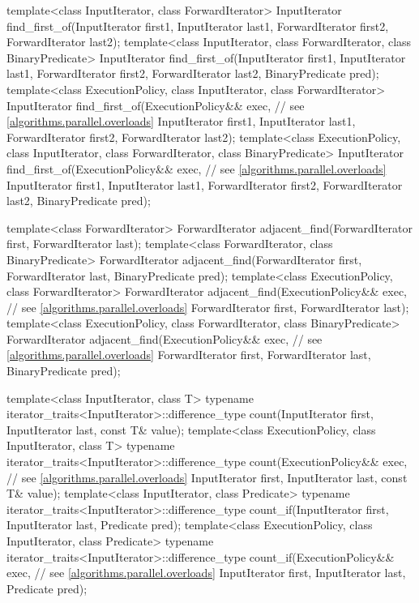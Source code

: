 \begin{codeblock}
{  template<class InputIterator, class ForwardIterator>
    InputIterator
      find_first_of(InputIterator first1, InputIterator last1,
                    ForwardIterator first2, ForwardIterator last2);
  template<class InputIterator, class ForwardIterator, class BinaryPredicate>
    InputIterator
      find_first_of(InputIterator first1, InputIterator last1,
                    ForwardIterator first2, ForwardIterator last2,
                    BinaryPredicate pred);
  template<class ExecutionPolicy, class InputIterator, class ForwardIterator>
    InputIterator
      find_first_of(ExecutionPolicy&& exec, // see \ref{algorithms.parallel.overloads}
                    InputIterator first1, InputIterator last1,
                    ForwardIterator first2, ForwardIterator last2);
  template<class ExecutionPolicy, class InputIterator,
           class ForwardIterator, class BinaryPredicate>
    InputIterator
      find_first_of(ExecutionPolicy&& exec, // see \ref{algorithms.parallel.overloads}
                    InputIterator first1, InputIterator last1,
                    ForwardIterator first2, ForwardIterator last2,
                    BinaryPredicate pred);

  template<class ForwardIterator>
    ForwardIterator adjacent_find(ForwardIterator first,
                                  ForwardIterator last);
  template<class ForwardIterator, class BinaryPredicate>
    ForwardIterator adjacent_find(ForwardIterator first,
                                  ForwardIterator last,
                                  BinaryPredicate pred);
  template<class ExecutionPolicy, class ForwardIterator>
    ForwardIterator adjacent_find(ExecutionPolicy&& exec, // see \ref{algorithms.parallel.overloads}
                                  ForwardIterator first,
                                  ForwardIterator last);
  template<class ExecutionPolicy, class ForwardIterator, class BinaryPredicate>
    ForwardIterator adjacent_find(ExecutionPolicy&& exec, // see \ref{algorithms.parallel.overloads}
                                  ForwardIterator first,
                                  ForwardIterator last,
                                  BinaryPredicate pred);

  template<class InputIterator, class T>
    typename iterator_traits<InputIterator>::difference_type
      count(InputIterator first, InputIterator last, const T& value);
  template<class ExecutionPolicy, class InputIterator, class T>
    typename iterator_traits<InputIterator>::difference_type
      count(ExecutionPolicy&& exec, // see \ref{algorithms.parallel.overloads}
            InputIterator first, InputIterator last, const T& value);
  template<class InputIterator, class Predicate>
    typename iterator_traits<InputIterator>::difference_type
      count_if(InputIterator first, InputIterator last, Predicate pred);
  template<class ExecutionPolicy, class InputIterator, class Predicate>
    typename iterator_traits<InputIterator>::difference_type
      count_if(ExecutionPolicy&& exec, // see \ref{algorithms.parallel.overloads}
            InputIterator first, InputIterator last, Predicate pred);

}
\end{codeblock}
